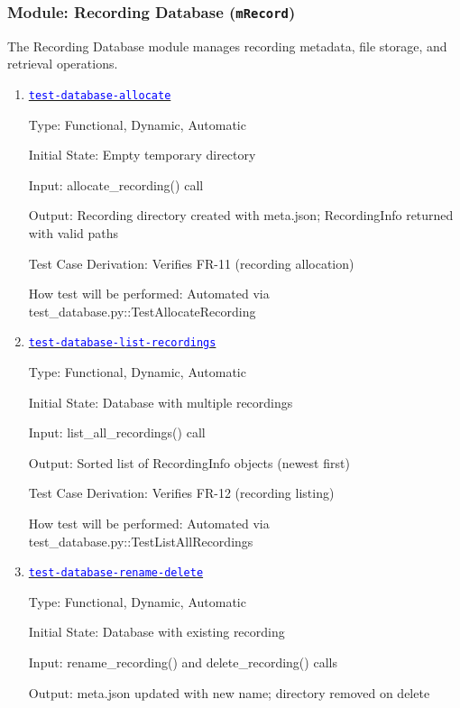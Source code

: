 \documentclass[12pt, titlepage]{article}
\newcommand{\mref}[1]{\texttt{#1}}
\newcommand{\tid}[1]{\hyperlink{tid:#1}{\textcolor{blue}{\texttt{#1}}}}
\begin{document}
\subsubsection{Module: Recording Database (\mref{mRecord})}

The Recording Database module manages recording metadata, file storage, and
retrieval operations.

\begin{enumerate}

  \item{\tid{test-database-allocate}\\}

        Type: Functional, Dynamic, Automatic

        Initial State: Empty temporary directory

        Input: allocate\_recording() call

        Output: Recording directory created with meta.json; RecordingInfo returned with
        valid paths

        Test Case Derivation: Verifies FR-11 (recording allocation)

        How test will be performed: Automated via
        test\_database.py::TestAllocateRecording

  \item{\tid{test-database-list-recordings}\\}

        Type: Functional, Dynamic, Automatic

        Initial State: Database with multiple recordings

        Input: list\_all\_recordings() call

        Output: Sorted list of RecordingInfo objects (newest first)

        Test Case Derivation: Verifies FR-12 (recording listing)

        How test will be performed: Automated via
        test\_database.py::TestListAllRecordings

  \item{\tid{test-database-rename-delete}\\}

        Type: Functional, Dynamic, Automatic

        Initial State: Database with existing recording

        Input: rename\_recording() and delete\_recording() calls

        Output: meta.json updated with new name; directory removed on delete


\end{enumerate}
\end{document}
